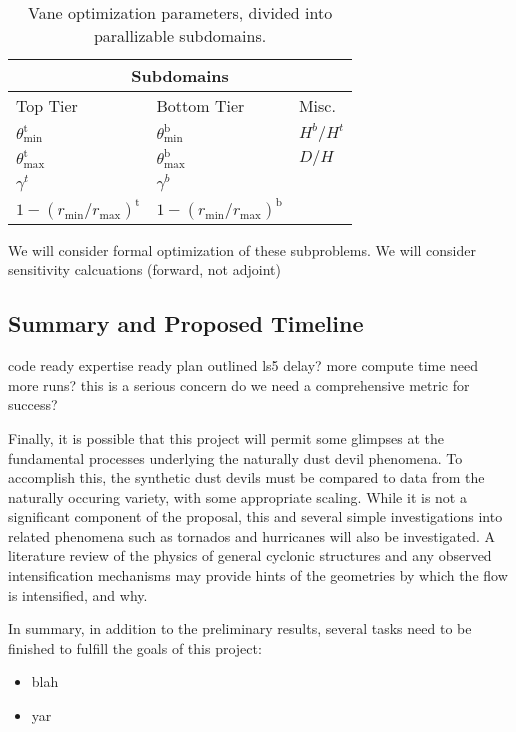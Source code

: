 \begin{center}
\begin{table}[h]
 \centering
  \begin{tabular}{|l | l | l |}
   \multicolumn{3}{c}{Subdomains} \\
    \hline
   Top Tier & Bottom Tier & Misc. \\
   \hline
   $\theta^{\text{t}}_{\text{min}}$ & $\theta^{\text{b}}_{\text{min}}$ &
       $H^b/H^t$ \\
   $\theta^{\text{t}}_{\text{max}}$ & $\theta^{\text{b}}_{\text{max}}$&
	   $D/H$ \\ 
   $\gamma^t$ & $\gamma^b$ & \\
   $1 - (r_{\text{min}} / r_{\text{max}})^{\text{t}}$ & $1 -
       (r_{\text{min}} / r_{\text{max}})^{\text{b}}$ & \\
   \hline
  \end{tabular}
  \caption{Vane optimization parameters, divided into parallizable
 subdomains.} 
  \label{tab:opt}
\end{table}
\end{center}

% 
% 

We will consider formal optimization of these subproblems. 
We will consider sensitivity calcuations (forward, not adjoint)


\subsection{Summary and Proposed Timeline}


%
%

code ready
expertise ready
plan outlined
ls5 delay?
more compute time
need more runs? this is a serious concern
do we need a comprehensive metric for success?

%
%
Finally, it is possible that this project will permit some glimpses 
at the fundamental processes underlying the naturally dust devil phenomena. To accomplish this, 
the synthetic dust devils must be compared to data from the naturally occuring variety, 
with some appropriate scaling. While it is not a significant component of the proposal, 
this and several simple investigations into related phenomena such as tornados and hurricanes will also 
be investigated. A literature review of the physics of general cyclonic structures and any  
observed intensification mechanisms may provide hints of the geometries by which the flow is 
intensified, and why. 

%
%
In summary, in addition to the preliminary results, several tasks need
to be finished to fulfill the goals of this project:

\begin{itemize}
\item blah
\item yar
\end{itemize}

%
%
